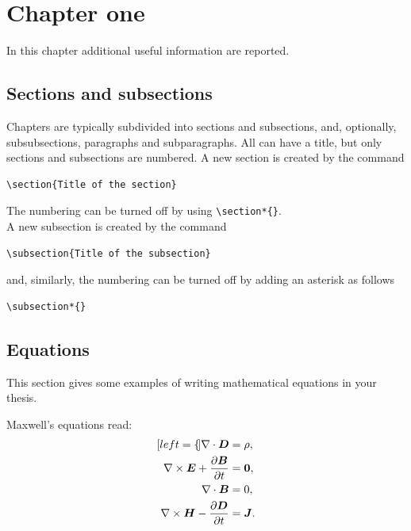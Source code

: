 \documentclass{Configuration_Files/PoliMi3i_thesis}
\begin{document}
\chapter{Chapter one}
\label{ch:chapter_one}%

In this chapter additional useful information are reported.

\section{Sections and subsections}
\label{sec:section_name}
Chapters are typically subdivided into sections and subsections, and, optionally,
subsubsections, paragraphs and subparagraphs.
All can have a title, but only sections and subsections are numbered.
A new section is created by the command
\begin{verbatim}
\section{Title of the section}
\end{verbatim}
The numbering can be turned off by using \verb|\section*{}|.
\\
A new subsection is created by the command
\begin{verbatim}
\subsection{Title of the subsection}
\end{verbatim}
and, similarly, the numbering can be turned off by adding an asterisk as follows 
\begin{verbatim}
\subsection*{}
\end{verbatim}

\section{Equations}
\label{sec:eqs}
This section gives some examples of writing mathematical equations in your thesis.

Maxwell's equations read:
\begin{subequations}
    \label{eq:maxwell}
    \begin{align}[left=\empheqlbrace]
    \nabla\cdot \bm{D} & = \rho, \label{eq:maxwell1} \\
    \nabla \times \bm{E} +  \frac{\partial \bm{B}}{\partial t} & = \bm{0}, \label{eq:maxwell2} \\
    \nabla\cdot \bm{B} & = 0, \label{eq:maxwell3} \\
    \nabla \times \bm{H} - \frac{\partial \bm{D}}{\partial t} &= \bm{J}. \label{eq:maxwell4}
    \end{align}
\end{subequations}
\end{document}

